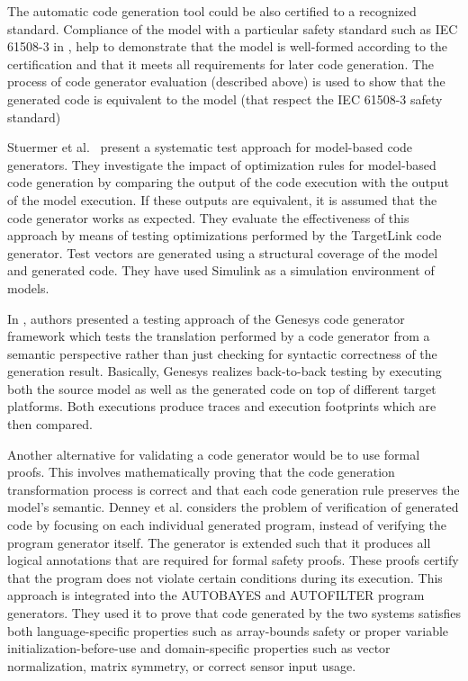 The automatic code generation tool could be also certified to a recognized standard. Compliance of the model with a particular safety standard such as IEC 61508-3 in \cite{conrad2009testing}, help to demonstrate that the model is well-formed according to the certification and that it meets all requirements for later code generation. The process of code generator evaluation (described above) is used to show that the generated code is equivalent to the model (that respect the IEC 61508-3 safety standard)

Stuermer et al.~\cite{stuermer2007systematic} present a systematic test approach for model-based code generators. They investigate the impact of optimization rules for model-based code generation by comparing the output of the code execution with the output of the model execution. 
If these outputs are equivalent, it is assumed that the code generator works as expected. 
They evaluate the effectiveness of this approach by means of testing optimizations performed by the TargetLink code generator. Test vectors are generated using a structural coverage of the model and generated code.
They have used Simulink as a simulation environment of models. 

In \cite{jorges2014back}, authors presented a testing approach of the Genesys code generator framework which tests the translation performed by a code generator from a semantic perspective rather than just checking for syntactic correctness of the generation result. Basically,
Genesys realizes back-to-back testing by executing both the source model as well as the generated code on top of different target platforms. Both executions produce traces and execution footprints which are then compared.

Another alternative for validating a code generator would be to use formal proofs\cite{basir2008constructing}. This involves mathematically proving that the code generation transformation process is correct and that each code generation rule preserves the model's semantic. 
Denney et al.\cite{denney2005certifiable} considers the problem of verification of generated code by focusing on each individual generated program, instead of verifying the program generator itself.
The generator is extended such that it produces all logical annotations that are
required for formal safety proofs. These proofs certify that the program does not violate certain conditions during its execution. This approach is integrated into the AUTOBAYES and
AUTOFILTER program generators. They used it to prove that code generated by the two systems satisfies both language-specific properties such as array-bounds safety or proper variable initialization-before-use and domain-specific properties such as vector normalization, matrix symmetry, or correct sensor input usage.

